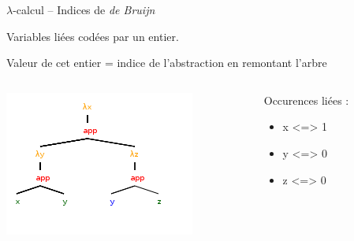 \documentclass{beamer}
\begin{document}
\begin{frame}{$\lambda$-calcul -- Indices de \emph{de Bruijn}}

  Variables liées codées par un entier.\medskip

  Valeur de cet entier = indice de l'abstraction en remontant
  l'arbre\bigskip

  \begin{columns}
    \begin{column}{5cm}
      \includegraphics{lambda1.png}
    \end{column}

    \begin{column}{5cm}
      Occurences liées :
      \begin{itemize}
      \item x <=> 1
      \item y <=> 0
      \item z <=> 0
      \end{itemize}
    \end{column}
  \end{columns}

\end{frame}
\end{document}
